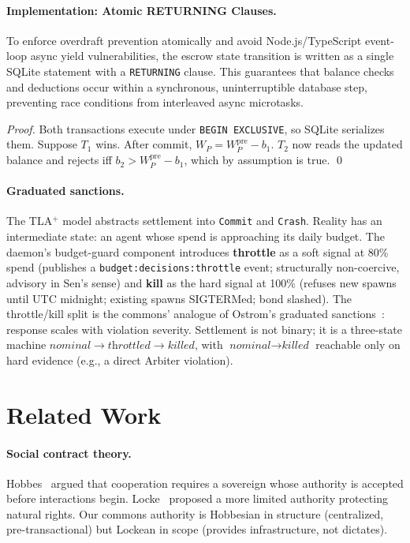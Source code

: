 \documentclass[11pt,a4paper]{article}
\theoremstyle{definition}
\theoremstyle{remark}
\begin{document}
\paragraph{Implementation: Atomic RETURNING Clauses.}
To enforce overdraft prevention atomically and avoid Node.js/TypeScript event-loop async yield vulnerabilities, the escrow state transition is written as a single SQLite statement with a \texttt{RETURNING} clause. This guarantees that balance checks and deductions occur within a synchronous, uninterruptible database step, preventing race conditions from interleaved async microtasks.

\begin{proof}
Both transactions execute under \texttt{BEGIN EXCLUSIVE}, so SQLite serializes them. Suppose $T_1$ wins. After commit, $W_P = W_P^{\text{pre}} - b_1$. $T_2$ now reads the updated balance and rejects iff $b_2 > W_P^{\text{pre}} - b_1$, which by assumption is true. \qed
\end{proof}

\paragraph{Graduated sanctions.} The TLA$^{+}$ model abstracts settlement into \texttt{Commit} and \texttt{Crash}. Reality has an intermediate state: an agent whose spend is approaching its daily budget. The daemon's budget-guard component introduces \textbf{throttle} as a soft signal at 80\% spend (publishes a \texttt{budget:decisions:throttle} event; structurally non-coercive, advisory in Sen's sense) and \textbf{kill} as the hard signal at 100\% (refuses new spawns until UTC midnight; existing spawns SIGTERMed; bond slashed). The throttle/kill split is the commons' analogue of Ostrom's graduated sanctions~\cite{ostrom1990governing}: response scales with violation severity. Settlement is not binary; it is a three-state machine $\textit{nominal} \to \textit{throttled} \to \textit{killed}$, with $\textit{nominal} \to \textit{killed}$ reachable only on hard evidence (e.g., a direct Arbiter violation).

\section{Related Work}\label{sec:related}

\paragraph{Social contract theory.} Hobbes~\cite{hobbes1651leviathan} argued that cooperation requires a sovereign whose authority is accepted before interactions begin. Locke~\cite{locke1689two} proposed a more limited authority protecting natural rights. Our commons authority is Hobbesian in structure (centralized, pre-transactional) but Lockean in scope (provides infrastructure, not dictates).
\end{document}
